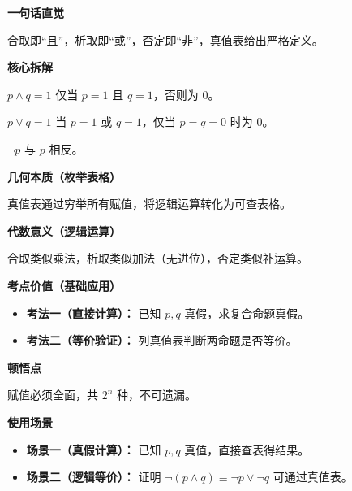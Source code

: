 \begin{explanationbox}
	\textbf{\textcolor{CExplanation}{一句话直觉}}

	合取即“且”，析取即“或”，否定即“非”，真值表给出严格定义。

	\medskip
	\textbf{\textcolor{CExplanation}{核心拆解}}
	\begin{description}[style=nextline, leftmargin=2.8em, labelsep=0.5em, itemsep=0.45em]
		\item[\textbf{要点一（合取）：}] $p\land q=1$ 仅当 $p=1$ 且 $q=1$，否则为 $0$。
		\item[\textbf{要点二（析取）：}] $p\lor q=1$ 当 $p=1$ 或 $q=1$，仅当 $p=q=0$ 时为 $0$。
		\item[\textbf{要点三（否定）：}] $\lnot p$ 与 $p$ 相反。
	\end{description}

	\medskip
	\textbf{\textcolor{CExplanation}{几何本质（枚举表格）}}

	真值表通过穷举所有赋值，将逻辑运算转化为可查表格。

	\medskip
	\textbf{\textcolor{CExplanation}{代数意义（逻辑运算）}}

	合取类似乘法，析取类似加法（无进位），否定类似补运算。

	\medskip
	\textbf{\textcolor{CExplanation}{考点价值（基础应用）}}
	\begin{itemize}[leftmargin=*, itemsep=0.5em, topsep=0.4em]
		\item \textbf{考法一（直接计算）：} 已知 $p,q$ 真假，求复合命题真假。
		\item \textbf{考法二（等价验证）：} 列真值表判断两命题是否等价。
	\end{itemize}

	\medskip
	\textbf{\textcolor{CExplanation}{顿悟点}}

	赋值必须全面，共 $2^n$ 种，不可遗漏。

	\medskip
	\textbf{\textcolor{CExplanation}{使用场景}}
	\begin{itemize}[leftmargin=*, itemsep=0.5em, topsep=0.4em]
		\item \textbf{场景一（真假计算）：} 已知 $p,q$ 真值，直接查表得结果。
		\item \textbf{场景二（逻辑等价）：} 证明 $\lnot(p\land q)\equiv\lnot p\lor\lnot q$ 可通过真值表。
	\end{itemize}
\end{explanationbox}
